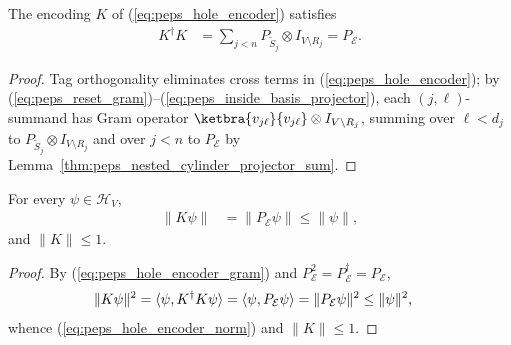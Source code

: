 \begin{lemma}
    \label{thm:peps_hole_encoder_gram}
    \leanok
    The encoding $K$ of (\ref{eq:peps_hole_encoder}) satisfies
    \begin{align}
        K^\dagger K
         & =\sum_{j<n}P_{\widetilde S_j}\otimes I_{V\setminus R_j}
        =P_{\mathcal E}.
        \label{eq:peps_hole_encoder_gram}
    \end{align}
\end{lemma}
\begin{proof}
    \leanok
    Tag orthogonality eliminates cross terms in (\ref{eq:peps_hole_encoder}); by
    (\ref{eq:peps_reset_gram})--(\ref{eq:peps_inside_basis_projector}), each
    $(j,\ell)$-summand has Gram operator
    $\ketbra{v_{j\ell}}{v_{j\ell}}\otimes I_{V\setminus R_j}$, summing over
    $\ell<d_j$ to $P_{\widetilde S_j}\otimes I_{V\setminus R_j}$ and over $j<n$
    to $P_{\mathcal E}$ by Lemma~\ref{thm:peps_nested_cylinder_projector_sum}.
\end{proof}

\begin{lemma}
    \label{thm:peps_hole_encoder_norm}
    \leanok
    For every $\psi\in\mathcal H_V$,
    \begin{align}
        \|K\psi\| & =\|P_{\mathcal E}\psi\|\leq\|\psi\|,
        \label{eq:peps_hole_encoder_norm}
    \end{align}
    and $\|K\|\leq1$.
\end{lemma}
\begin{proof}
    \leanok
    By (\ref{eq:peps_hole_encoder_gram}) and $P_{\mathcal E}^2=P_{\mathcal E}^\dagger=P_{\mathcal E}$,
    \begin{align}
        \|K\psi\|^2
         & =\langle\psi,K^\dagger K\psi\rangle
        =\langle\psi,P_{\mathcal E}\psi\rangle
        =\|P_{\mathcal E}\psi\|^2\leq\|\psi\|^2,\notag
    \end{align}
    whence (\ref{eq:peps_hole_encoder_norm}) and $\|K\|\leq1$.
\end{proof}

